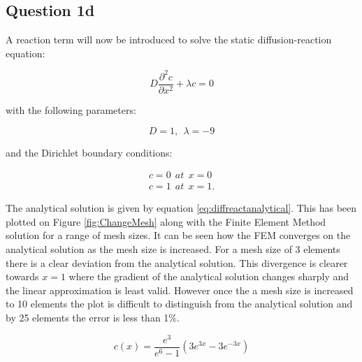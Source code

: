 \documentclass[11pt]{article}
\begin{document}
\subsection{Question 1d}

A reaction term will now be introduced to solve the static diffusion-reaction equation:

\begin{equation*}
D \frac{\partial^2 c}{\partial x^2} + \lambda c = 0
\end{equation*}

with the following parameters:

\begin{equation*}
D = 1, \ \  \lambda = -9
\end{equation*}

and the Dirichlet boundary conditions:


\begin{align*}
c = 0 \ \ at \ \ x = 0 \\
c = 1 \ \ at \ \  x= 1  .
\end{align*}


The analytical solution is given by equation \ref{eq:diffreactanalytical}. This has been plotted on Figure \ref{fig:ChangeMesh} along with the Finite Element Method solution for a range of mesh sizes. It can be seen how the FEM converges on the analytical solution as the mesh size is increased. For a mesh size of 3 elements there is a clear deviation from the analytical solution. This divergence is clearer towards $x = 1$ where the gradient of the analytical solution changes sharply and the linear approximation is least valid. However once the a mesh size is increased to 10 elements the plot is difficult to distinguish from the analytical solution and by 25 elements the error is less than 1\%.

\begin{equation}\label{eq:diffreactanalytical}
c(x) = \frac{e^3 }{e^6 - 1} (3e^{3x} - 3e^{-3x})
\end{equation}
\end{document}
